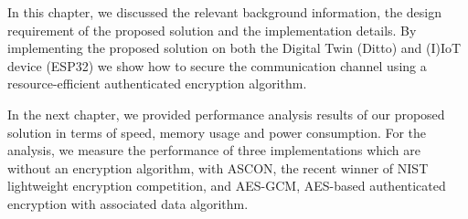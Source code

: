  
In this chapter, we discussed the relevant background information, the design requirement of the proposed solution and the implementation details. By implementing the proposed solution on both the Digital Twin (Ditto) and (I)IoT device (ESP32) we show how to secure the communication channel using a resource-efficient authenticated encryption algorithm. 

In the next chapter, we provided performance analysis results of our proposed solution in terms of speed, memory usage and power consumption. For the analysis, we measure the performance of three implementations which are without an encryption algorithm, with ASCON, the recent winner of NIST lightweight encryption competition, and AES-GCM, AES-based authenticated encryption with associated data algorithm. 